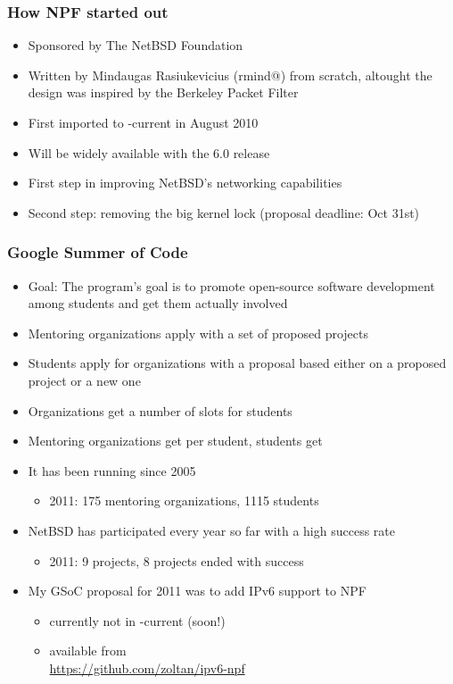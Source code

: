 \documentclass{beamer}
\begin{document}
\begin{frame}
\frametitle{How NPF started out}
\begin{itemize}
	\item Sponsored by The NetBSD Foundation
	\item Written by Mindaugas Rasiukevicius (rmind@) from scratch, altought the design was inspired by the Berkeley Packet Filter
	\item First imported to -current in August 2010
	\item Will be widely available with the 6.0 release
	\item First step in improving NetBSD's networking capabilities
	\item Second step: removing the big kernel lock (proposal deadline: Oct 31st)
\end{itemize}
\end{frame}

\begin{frame}
\frametitle{Google Summer of Code}
\begin{itemize}
	\item Goal: The program's goal is to promote open-source software development among students and get them actually involved
\pause
	\item Mentoring organizations apply with a set of proposed projects
\pause
	\item Students apply for organizations with a proposal based either on a proposed project or a new one
\pause
	\item Organizations get a number of slots for students
\pause
	\item Mentoring organizations get  per student, students get 
\pause
	\item It has been running since 2005
		\begin{itemize}
			\item 2011: 175 mentoring organizations, 1115 students
		\end{itemize}
	\item NetBSD has participated every year so far with a high success rate
		\begin{itemize}
			\item 2011: 9 projects, 8 projects ended with success
		\end{itemize}
	\item My GSoC proposal for 2011 was to add IPv6 support to NPF
		\begin{itemize}
			\item currently not in -current (soon!)
			\item available from \\ \url{https://github.com/zoltan/ipv6-npf}
		\end{itemize}
\end{itemize}
\end{frame}
\end{document}
